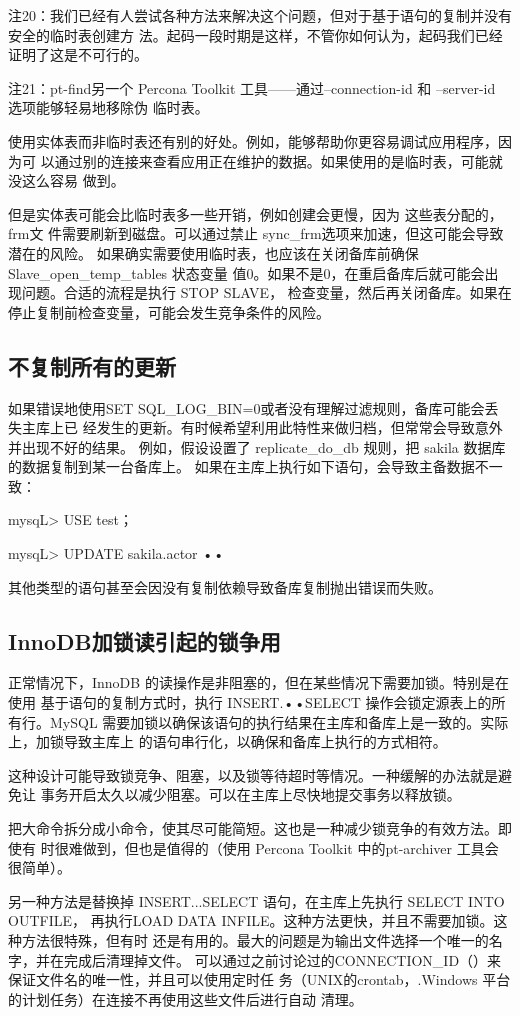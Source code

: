 注20：我们已经有人尝试各种方法来解决这个问题，但对于基于语句的复制并没有安全的临时表创建方
法。起码一段时期是这样，不管你如何认为，起码我们已经证明了这是不可行的。

注21：pt-find另一个 Percona Toolkit 工具——通过--connection-id 和 --server-id 选项能够轻易地移除伪
临时表。

使用实体表而非临时表还有别的好处。例如，能够帮助你更容易调试应用程序，因为可
以通过别的连接来查看应用正在维护的数据。如果使用的是临时表，可能就没这么容易
做到。

但是实体表可能会比临时表多一些开销，例如创建会更慢，因为 这些表分配的，frm文
件需要刷新到磁盘。可以通过禁止 sync\_frm选项来加速，但这可能会导致潜在的风险。
如果确实需要使用临时表，也应该在关闭备库前确保 Slave\_open\_temp\_tables 状态变量
值0。如果不是0，在重启备库后就可能会出现问题。合适的流程是执行 STOP SLAVE，
检查变量，然后再关闭备库。如果在停止复制前检查变量，可能会发生竞争条件的风险。
\subsection{不复制所有的更新}
如果错误地使用SET SQL\_LOG\_BIN=0或者没有理解过滤规则，备库可能会丢失主库上已
经发生的更新。有时候希望利用此特性来做归档，但常常会导致意外并出现不好的结果。
例如，假设设置了 replicate\_do\_db 规则，把 sakila 数据库的数据复制到某一台备库上。
如果在主库上执行如下语句，会导致主备数据不一致：

mysqL> USE test；

mysqL> UPDATE sakila.actor ••

其他类型的语句甚至会因没有复制依赖导致备库复制抛出错误而失败。

\subsection{InnoDB加锁读引起的锁争用}
正常情况下，InnoDB 的读操作是非阻塞的，但在某些情况下需要加锁。特别是在使用
基于语句的复制方式时，执行 INSERT.••SELECT 操作会锁定源表上的所有行。MySQL
需要加锁以确保该语句的执行结果在主库和备库上是一致的。实际上，加锁导致主库上
的语句串行化，以确保和备库上执行的方式相符。

这种设计可能导致锁竞争、阻塞，以及锁等待超时等情况。一种缓解的办法就是避免让
事务开启太久以减少阻塞。可以在主库上尽快地提交事务以释放锁。

把大命令拆分成小命令，使其尽可能简短。这也是一种减少锁竞争的有效方法。即使有
时很难做到，但也是值得的（使用 Percona Toolkit 中的pt-archiver 工具会很简单）。

另一种方法是替换掉 INSERT...SELECT 语句，在主库上先执行 SELECT INTO OUTFILE，
再执行LOAD DATA INFILE。这种方法更快，并且不需要加锁。这种方法很特殊，但有时
还是有用的。最大的问题是为输出文件选择一个唯一的名字，并在完成后清理掉文件。
可以通过之前讨论过的CONNECTION\_ID（）来保证文件名的唯一性，并且可以使用定时任
务（UNIX的crontab，.Windows 平台的计划任务）在连接不再使用这些文件后进行自动
清理。

